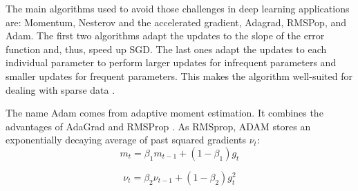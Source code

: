 The main algorithms used to avoid those challenges in deep learning applications are: Momentum, Nesterov and the accelerated gradient, Adagrad, RMSPop, and Adam. The first two algorithms adapt the updates to the slope of the error function and, thus, speed up SGD. The last ones adapt the updates to each individual parameter to perform larger updates for infrequent parameters and smaller updates for frequent parameters. This makes the algorithm well-suited for dealing with sparse data \cite{ruder2016overview}.




  
The name Adam comes from adaptive moment estimation. It combines the advantages of AdaGrad and RMSProp \cite{kingma2014adam}. As RMSprop, ADAM  stores an exponentially decaying average of past squared gradients $\nu_t$: %
\begin{equation}
m_t=\beta_1 m_{t-1} + (1-\beta_1)g_t
\end{equation}

\begin{equation}
\nu_t=\beta_2 \nu_{t-1} + (1-\beta_2)g^2_t
\end{equation}

